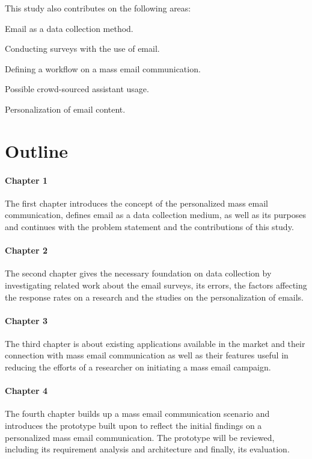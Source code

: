 This study also contributes on the following areas:

\begin{compactenum}
	\item Email as a data collection method.
	\item Conducting surveys with the use of email.
	\item Defining a workflow on a mass email communication.
	\item Possible crowd-sourced assistant usage.
	\item Personalization of email content.
\end{compactenum}

\section{Outline}
\label{sec:3:Outline}

\paragraph{Chapter 1} The first chapter introduces the concept of the personalized mass email communication, defines email as a data collection medium, as well as its purposes and continues with the problem statement and the contributions of this study.

\paragraph{Chapter 2} The second chapter gives the necessary foundation on data collection by investigating related work about the email surveys, its errors, the factors affecting the response rates on a research and the studies on the personalization of emails.

\paragraph{Chapter 3} The third chapter is about existing applications available in the market and their connection with mass email communication as well as their features useful in reducing the efforts of a researcher on initiating a mass email campaign.

\paragraph{Chapter 4} The fourth chapter builds up a mass email communication scenario and introduces the prototype built upon to reflect the initial findings on a personalized mass email communication. The prototype will be reviewed, including its requirement analysis and architecture and finally, its evaluation.

